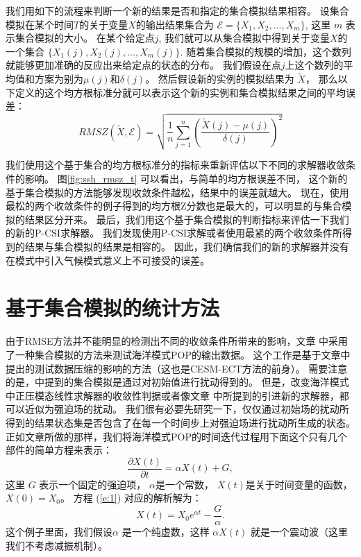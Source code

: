  
我们用如下的流程来判断一个新的结果是否和指定的集合模拟结果相容。 
设集合模拟在某个时间$T$的关于变量$X$的输出结果集合为 $\mathcal{E}=\{X_1,X_2,...,X_m\}$, 这里
$m$ 表示集合模拟的大小。 
在某个给定点$j$, 我们就可以从集合模拟中得到关于变量$X$的一个集合
$\{X_1(j),X_2(j),...,X_m(j)\}$.
随着集合模拟的规模的增加，这个数列就能够更加准确的反应出来给定点的状态的分布。 
我们假设在点$j$上这个数列的平均值和方案为别为$\mu (j) $和$\delta (j)$。 
然后假设新的实例的模拟结果为 $\tilde{X}$， 那么以下定义的这个均方根标准分就可以表示这个新的实例和集合模拟结果之间的平均误差：
$$ RMSZ(\tilde{X}, \mathcal{E}) =  \sqrt{\frac{1}{n}\sum_{j=1}^n(\frac{\tilde{X}(j) -\mu (j)}{\delta (j)})^2}$$

我们使用这个基于集合的均方根标准分的指标来重新评估以下不同的求解器收敛条件的影响。 
图\ref{fig:ssh_rmsz_t} 可以看出，与简单的均方根误差不同， 这个新的基于集合模拟的方法能够发现收敛条件越松，结果中的误差就越大。 
现在，使用最松的两个收敛条件的例子得到的均方根Z分数也是最大的，可以明显的与集合模拟的结果区分开来。 
最后，我们用这个基于集合模拟的判断指标来评估一下我们的新的P-CSI求解器。 我们发现使用P-CSI求解或者使用最紧的两个收敛条件所得到的结果与集合模拟的结果是相容的。 
因此，我们确信我们的新的求解器并没有在模式中引入气候模式意义上不可接受的误差。 




\section{基于集合模拟的统计方法}\label{verify:statistic}
由于RMSE方法并不能明显的检测出不同的收敛条件所带来的影响，文章  中采用了一种集合模拟的方法来测试海洋模式POP的输出数据。 
这个工作是基于文章中提出的测试数据压缩的影响的方法（这也是CESM-ECT方法的前身）。
需要注意的是，中提到的集合模拟是通过对初始值进行扰动得到的。 
但是，改变海洋模式中正压模态线性求解器的收敛性判据或者像文章 中所提到的引进新的求解器，都可以近似为强迫场的扰动。 
我们很有必要先研究一下，仅仅通过初始场的扰动所得到的结果状态集是否包含了在每一个时间步上对强迫场进行扰动所生成的状态。
正如文章所做的那样，我们将海洋模式POP的时间迭代过程用下面这个只有几个部件的简单方程来表示：
\begin{equation}
\frac{\partial X(t)}{\partial t} = \alpha X(t) +G,
\label{e:1}
\end{equation}
这里 $G$ 表示一个固定的强迫项，  $\alpha$是一个常数，  $X(t)$是关于时间变量的函数， $X(0) = X_0$。 
方程 (\ref{e:1}) 对应的解析解为：
\begin{equation}
X(t) = X_0e^{\alpha t } -\frac{G}{\alpha}. 
\label{e:2}
\end{equation}
这个例子里面，我们假设$\alpha$ 是一个纯虚数，这样 $\alpha X(t)$ 就是一个震动波（这里我们不考虑减振机制）。 

